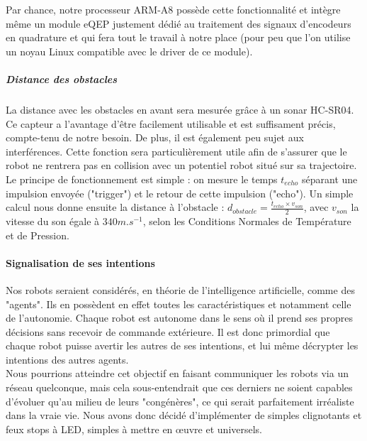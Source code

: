 				Par chance, notre processeur ARM-A8 possède cette fonctionnalité et intègre même un module eQEP\cite{bib12} \label{eQEP} justement dédié au traitement des signaux d'encodeurs en quadrature et qui fera tout le travail à notre place (pour peu que l'on utilise un noyau Linux compatible avec le driver de ce module).

			\subparagraph*{Distance des obstacles}

				La distance avec les obstacles en avant sera mesurée grâce à un sonar HC-SR04. Ce capteur a l'avantage d'être facilement utilisable et est suffisament précis, compte-tenu de notre besoin. De plus, il est également peu sujet aux interférences.
				Cette fonction sera particulièrement utile afin de s'assurer que le robot ne rentrera pas en collision avec un potentiel robot situé sur sa trajectoire.\\
				
				Le principe de fonctionnement est simple : on mesure le temps $t_{echo} $ séparant une impulsion envoyée ("trigger") et le retour de cette impulsion ("echo"). Un simple calcul nous donne ensuite la distance à l'obstacle : $d_{obstacle} = \frac{t_{echo} \times v_{son}}{2}$, avec $v_{son}$ la vitesse du son égale à $340 m.s^{-1}$, selon les Conditions Normales de Température et de Pression.

		\paragraph{Signalisation de ses intentions}

			Nos robots seraient considérés, en théorie de l'intelligence artificielle, comme des "agents". Ils en possèdent en effet toutes les caractéristiques et notamment celle de l'autonomie. Chaque robot est autonome dans le sens où il prend ses propres décisions sans recevoir de commande extérieure. Il est donc primordial que chaque robot puisse avertir les autres de ses intentions, et lui même décrypter les intentions des autres agents.\\

			Nous pourrions atteindre cet objectif en faisant communiquer les robots via un réseau quelconque, mais cela sous-entendrait que ces derniers ne soient capables d'évoluer qu'au milieu de leurs "congénères", ce qui serait parfaitement irréaliste dans la vraie vie. Nous avons donc décidé d'implémenter de simples clignotants et feux stops à LED, simples à mettre en œuvre et universels.


